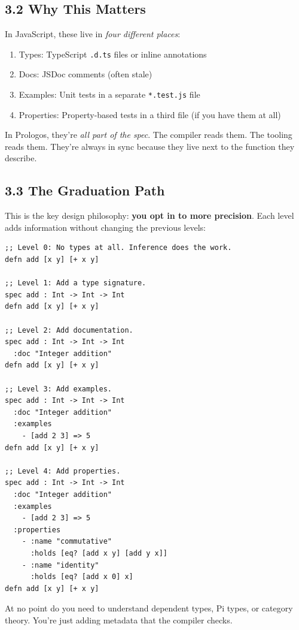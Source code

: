 \documentclass[11pt]{article}
\begin{document}
\subsection{3.2 Why This Matters}
\label{sec:org1f962fa}

In JavaScript, these live in \emph{four different places}:

\begin{enumerate}
\item Types: TypeScript \texttt{.d.ts} files or inline annotations
\item Docs: JSDoc comments (often stale)
\item Examples: Unit tests in a separate \texttt{*.test.js} file
\item Properties: Property-based tests in a third file (if you have them at all)
\end{enumerate}

In Prologos, they're \emph{all part of the spec}. The compiler reads them.
The tooling reads them. They're always in sync because they live next to
the function they describe.
\subsection{3.3 The Graduation Path}
\label{sec:org472063f}

This is the key design philosophy: \textbf{you opt in to more precision}. Each
level adds information without changing the previous levels:

\begin{verbatim}
;; Level 0: No types at all. Inference does the work.
defn add [x y] [+ x y]

;; Level 1: Add a type signature.
spec add : Int -> Int -> Int
defn add [x y] [+ x y]

;; Level 2: Add documentation.
spec add : Int -> Int -> Int
  :doc "Integer addition"
defn add [x y] [+ x y]

;; Level 3: Add examples.
spec add : Int -> Int -> Int
  :doc "Integer addition"
  :examples
    - [add 2 3] => 5
defn add [x y] [+ x y]

;; Level 4: Add properties.
spec add : Int -> Int -> Int
  :doc "Integer addition"
  :examples
    - [add 2 3] => 5
  :properties
    - :name "commutative"
      :holds [eq? [add x y] [add y x]]
    - :name "identity"
      :holds [eq? [add x 0] x]
defn add [x y] [+ x y]
\end{verbatim}

At no point do you need to understand dependent types, Pi types, or
category theory. You're just adding metadata that the compiler checks.
\end{document}
